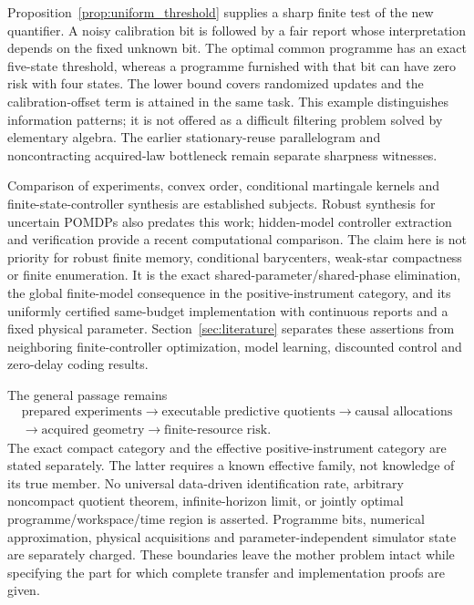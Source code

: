 Proposition~\ref{prop:uniform_threshold} supplies a sharp finite test of the new quantifier. A noisy calibration bit is followed by a fair report whose interpretation depends on the fixed unknown bit. The optimal common programme has an exact five-state threshold, whereas a programme furnished with that bit can have zero risk with four states. The lower bound covers randomized updates and the calibration-offset term is attained in the same task. This example distinguishes information patterns; it is not offered as a difficult filtering problem solved by elementary algebra. The earlier stationary-reuse parallelogram and noncontracting acquired-law bottleneck remain separate sharpness witnesses.

Comparison of experiments, convex order, conditional martingale kernels and finite-state-controller synthesis are established subjects\cite{blackwell,strassen,leskela,junges}. Robust synthesis for uncertain POMDPs also predates this work\cite{robustfsc}; hidden-model controller extraction and verification provide a recent computational comparison\cite{hiddenmodel}. The claim here is not priority for robust finite memory, conditional barycenters, weak-star compactness or finite enumeration. It is the exact shared-parameter/shared-phase elimination, the global finite-model consequence in the positive-instrument category, and its uniformly certified same-budget implementation with continuous reports and a fixed physical parameter. Section~\ref{sec:literature} separates these assertions from neighboring finite-controller optimization, model learning, discounted control and zero-delay coding results.

The general passage remains
\[
\begin{gathered}
 \text{prepared experiments}\longrightarrow\text{executable predictive quotients}\longrightarrow\text{causal allocations}\\
 \longrightarrow\text{acquired geometry}\longrightarrow\text{finite-resource risk}.
\end{gathered}
\]
The exact compact category and the effective positive-instrument category are stated separately. The latter requires a known effective family, not knowledge of its true member. No universal data-driven identification rate, arbitrary noncompact quotient theorem, infinite-horizon limit, or jointly optimal programme/workspace/time region is asserted. Programme bits, numerical approximation, physical acquisitions and parameter-independent simulator state are separately charged. These boundaries leave the mother problem intact while specifying the part for which complete transfer and implementation proofs are given.
